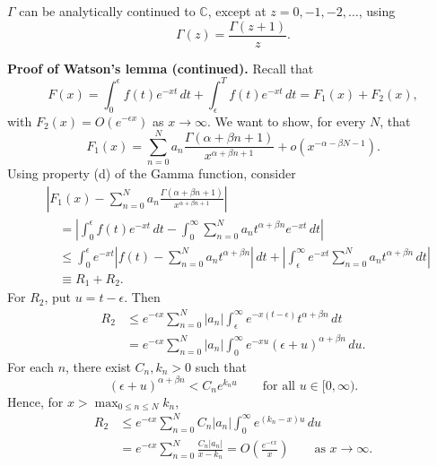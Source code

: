 \documentclass[11pt,a4paper]{article}
\begin{document}
$\Gamma$ can be analytically continued to $\mathbb{C}$, except at
$z=0,-1,-2,\ldots$, using
\[
    \Gamma(z)=\frac{\Gamma(z+1)}{z}.
\]

\noindent\textbf{Proof of Watson's lemma (continued).}
Recall that
\[
    F(x)=\int_0^\epsilon f(t)e^{-xt}\,dt
        +\int_\epsilon^T f(t)e^{-xt}\,dt
        =F_1(x)+F_2(x),
\]
with $F_2(x)=O(e^{-\epsilon x})$ as $x\to\infty$.
We want to show, for every $N$, that
\[
    F_1(x)=\sum_{n=0}^N
    a_n\frac{\Gamma(\alpha+\beta n+1)}{x^{\alpha+\beta n+1}}
    +o\!\left(x^{-\alpha-\beta N-1}\right).
\]
Using property (d) of the Gamma function, consider
\begin{align*}
    &\left|F_1(x)-\sum_{n=0}^N
    a_n\frac{\Gamma(\alpha+\beta n+1)}{x^{\alpha+\beta n+1}}\right|\\
    &\quad=\left|\int_0^\epsilon f(t)e^{-xt}\,dt
    -\int_0^\infty\sum_{n=0}^N a_n t^{\alpha+\beta n}e^{-xt}\,dt\right|\\
    &\quad\leq\int_0^\epsilon e^{-xt}
    \left|f(t)-\sum_{n=0}^N a_n t^{\alpha+\beta n}\right|\,dt
    +\left|\int_\epsilon^\infty e^{-xt}
    \sum_{n=0}^N a_n t^{\alpha+\beta n}\,dt\right|\\
    &\quad\equiv R_1+R_2.
\end{align*}
For $R_2$, put $u=t-\epsilon$. Then
\begin{align*}
    R_2
    &\leq e^{-\epsilon x}\sum_{n=0}^N |a_n|
    \int_\epsilon^\infty e^{-x(t-\epsilon)}t^{\alpha+\beta n}\,dt\\
    &=e^{-\epsilon x}\sum_{n=0}^N |a_n|
    \int_0^\infty e^{-xu}(\epsilon+u)^{\alpha+\beta n}\,du.
\end{align*}
For each $n$, there exist $C_n,k_n>0$ such that
\[
    (\epsilon+u)^{\alpha+\beta n}<C_n e^{k_nu}
    \qquad\text{for all }u\in[0,\infty).
\]
Hence, for $x>\max_{0\leq n\leq N}k_n$,
\begin{align*}
    R_2
    &\leq e^{-\epsilon x}\sum_{n=0}^N C_n|a_n|
    \int_0^\infty e^{(k_n-x)u}\,du\\
    &=e^{-\epsilon x}\sum_{n=0}^N\frac{C_n|a_n|}{x-k_n}
    =O\!\left(\frac{e^{-\epsilon x}}{x}\right)
    \qquad\text{as }x\to\infty.
\end{align*}
\end{document}
